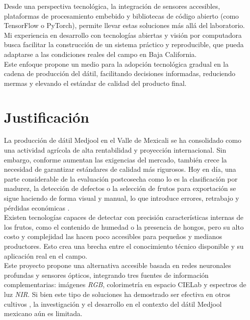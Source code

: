 Desde una perspectiva tecnológica, la integración de sensores accesibles, plataformas de procesamiento embebido y bibliotecas de código abierto (como TensorFlow o PyTorch), permite llevar estas soluciones más allá del laboratorio. Mi experiencia en desarrollo con tecnologías abiertas y visión por computadora busca facilitar la construcción de un sistema práctico y reproducible, que pueda adaptarse a las condiciones reales del campo en Baja California.\\

Este enfoque propone un medio para la adopción tecnológica gradual en la cadena de producción del dátil, facilitando decisiones informadas, reduciendo mermas y elevando el estándar de calidad del producto final.


\section{Justificación}

La producción de dátil Medjool en el Valle de Mexicali se ha consolidado como una actividad agrícola de alta rentabilidad y proyección internacional. Sin embargo, conforme aumentan las exigencias del mercado, también crece la necesidad de garantizar estándares de calidad más rigurosos. Hoy en día, una parte considerable de la evaluación postcosecha como lo es la clasificación por madurez, la detección de defectos o la selección de frutos para exportación se sigue haciendo de forma visual y manual, lo que introduce errores, retrabajo y pérdidas económicas \parencite{perez-perez_evaluation_2021}.\\

Existen tecnologías capaces de detectar con precisión características internas de los frutos, como el contenido de humedad o la presencia de hongos, pero su alto costo y complejidad las hacen poco accesibles para pequeños y medianos productores. Esto crea una brecha entre el conocimiento técnico disponible y su aplicación real en el campo.\\

Este proyecto propone una alternativa accesible basada en redes neuronales profundas y sensores ópticos, integrando tres fuentes de información complementarias: imágenes \textit{RGB}, colorimetría en espacio CIELab y espectros de luz \textit{NIR}. Si bien este tipo de soluciones ha demostrado ser efectiva en otros cultivos \parencite{chen_prediction_2024, wang_improving_2025}, la investigación y el desarrollo en el contexto del dátil Medjool mexicano aún es limitada.\\

